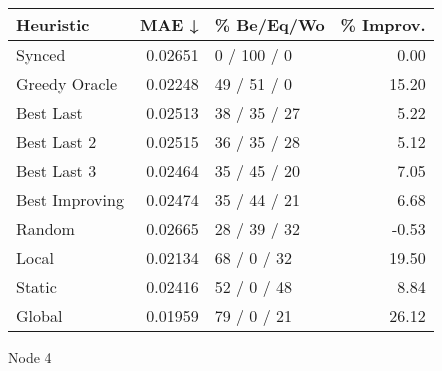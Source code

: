 \begin{tabular}{lrlr}
\toprule
\textbf{Heuristic} & \textbf{MAE ↓} & \textbf{\% Be/Eq/Wo} & \textbf{\% Improv.} \\
\midrule
            Synced &        0.02651 &          0 / 100 / 0 &                0.00 \\
     Greedy Oracle &        0.02248 &          49 / 51 / 0 &               15.20 \\
         Best Last &        0.02513 &         38 / 35 / 27 &                5.22 \\
       Best Last 2 &        0.02515 &         36 / 35 / 28 &                5.12 \\
       Best Last 3 &        0.02464 &         35 / 45 / 20 &                7.05 \\
    Best Improving &        0.02474 &         35 / 44 / 21 &                6.68 \\
            Random &        0.02665 &         28 / 39 / 32 &               -0.53 \\
             Local &        0.02134 &          68 / 0 / 32 &               19.50 \\
            Static &        0.02416 &          52 / 0 / 48 &                8.84 \\
            Global &        0.01959 &          79 / 0 / 21 &               26.12 \\
\bottomrule
\end{tabular}
\caption{Node 4}
\label{tab:non_lr05_le1_bs2_4}
